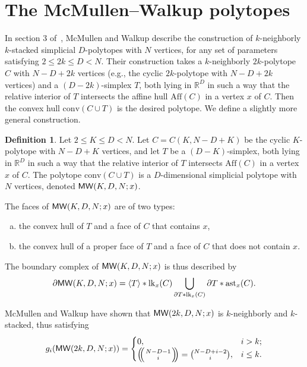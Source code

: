 \documentclass[a4paper,leqno]{article}
\theoremstyle{definition}
\newtheorem{definition}[theorem]{Definition}
\newcommand{\lk}{\mathrm{lk}}
\newcommand{\anst}{\mathrm{ast}}
\newcommand{\aff}{\mathrm{Aff}}
\newcommand{\conv}{\mathrm{conv}}
\newcommand{\R}{\mathbb{R}}
\newcommand{\mw}{{\sf MW}}
\def\mchoose#1#2{\ensuremath{\left(\kern-.3em\left(\genfrac{}{}{0pt}{}{#1}{#2}\right)\kern-.3em\right)}}
\begin{document}
\section{The McMullen--Walkup polytopes}\label{sec:MW}

In section 3 of~\cite{McMuW71}, McMullen and Walkup describe the construction of $k$-neighborly $k$-stacked simplicial $D$-polytopes with $N$ vertices, for any set of parameters satisfying $2\leq 2k\leq D < N$. Their construction takes a $k$-neighborly $2k$-polytope $C$ with $N-D+2k$ vertices (e.g., the cyclic $2k$-polytope with $N-D+2k$ vertices) and a $(D-2k)$-simplex $T$, both lying in $\R^D$ in such a way that the relative interior of $T$ intersects the affine hull $\aff (C)$ in a vertex $x$ of $C$. Then the convex hull $\conv (C\cup T)$ is the desired polytope. We define a slightly more general construction.
\begin{definition}\label{def:MW}
Let $2 \leq K \leq D < N$. Let $C=C(K,N-D+K)$ be the cyclic $K$-polytope with $N-D+K$ vertices, and let $T$ be a $(D-K)$-simplex, both lying in $\R^D$ in such a way that the relative interior of $T$ intersects $\aff (C)$ in a vertex $x$ of $C$. The polytope $\conv(C\cup T)$ is a $D$-dimensional simplicial polytope with $N$ vertices, denoted $\mw(K,D,N;x)$.
\end{definition}

The faces of $\mw(K,D,N;x)$ are of two types:
\begin{enumerate}[(a)]
\item the convex hull of $T$ and a face of $C$ that contains $x$,
\item the convex hull of a proper face of $T$ and a face of $C$ that does not contain $x$.
\end{enumerate}
The boundary complex of $\mw(K,D,N;x)$ is thus described by
\begin{equation}\label{eq:P}
\partial\mw(K,D,N;x)=\langle T\rangle \ast \lk_x(C)\bigcup_{\partial T\ast \lk_x(C)}\partial T\ast \anst_x(C).
\end{equation}

McMullen and Walkup have shown that $\mw(2k,D,N;x)$ is $k$-neighborly and $k$-stacked, thus satisfying
\begin{equation}\label{eq:g_of_P}
g_i(\mw(2k,D,N;x))=\begin{cases}
0, & i> k;\\
\mchoose{N-D-1}{i}=\binom{N-D+i-2}{i}, & i\leq k.
\end{cases}
\end{equation}
\end{document}
